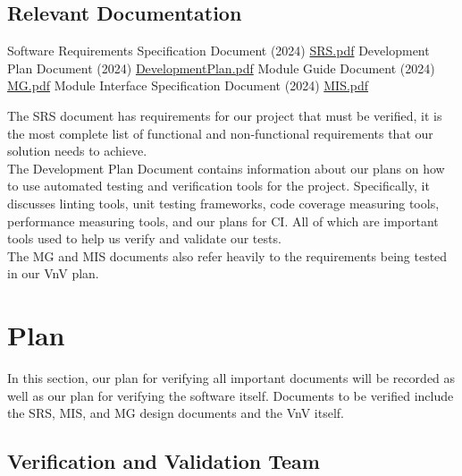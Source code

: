 \documentclass[12pt, titlepage]{article}
\begin{document}
\subsection{Relevant Documentation}

\begin{thebibliography}{9}
   Software Requirements Specification Document (2024)
  \href{../SRS-Volere/SRS.pdf}{SRS.pdf}
   Development Plan Document (2024)
  \href{../DevelopmentPlan/DevelopmentPlan.pdf}{DevelopmentPlan.pdf}
   Module Guide Document (2024)
  \href{../Design/SoftArchitecture/MG.pdf}{MG.pdf}
   Module Interface Specification Document (2024)
  \href{../Design/SoftDetailedDes/MIS.pdf}{MIS.pdf}
  \\
\end{thebibliography}

The SRS document has requirements for our project that must be verified, it is
the most complete list of functional and non-functional requirements that our
solution needs to achieve.\\

The Development Plan Document contains information about our plans on how to use 
automated testing and verification tools for the project. Specifically, it discusses
linting tools, unit testing frameworks, code coverage measuring tools, performance
measuring tools, and our plans for CI. All of which are important tools used to 
help us verify and validate our tests.\\

The MG and MIS documents also refer heavily to the requirements being tested
in our VnV plan.

\section{Plan}

In this section, our plan for verifying all important documents will be
recorded as well as our plan for verifying the software itself. Documents to
be verified include the SRS, MIS, and MG design documents and the VnV itself.

\subsection{Verification and Validation Team}
\end{document}
